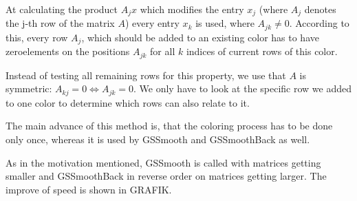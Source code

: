 \documentclass[a4paper,11pt]{scrartcl}
\begin{document}
At calculating the product $A_jx$ which modifies the entry $x_j$ (where $A_j$ 
denotes the j-th row of the matrix $A$) every entry $x_k$ is used, where
 $A_{jk} \neq 0$. According to this, every row $A_j$, which should be added 
to an existing color has to have zeroelements on the positions $A_{jk}$ for 
all $k$ indices of current rows of this color. 

Instead of testing all remaining rows for this property, we use that $A$ is
 symmetric: $A_{kj} = 0 \Leftrightarrow A_{jk} = 0$. We only have to look 
at the specific row we added to one color to determine which rows can also
 relate to it.

The main advance of this method is, that the coloring process has to be
 done only once, whereas it is used by GSSmooth and GSSmoothBack as well.

As in the motivation mentioned, GSSmooth is called with matrices getting
 smaller and GSSmoothBack in reverse order on matrices getting larger.
 The improve of speed is shown in GRAFIK.

\begin{figure}
%

\end{figure}
\end{document}
